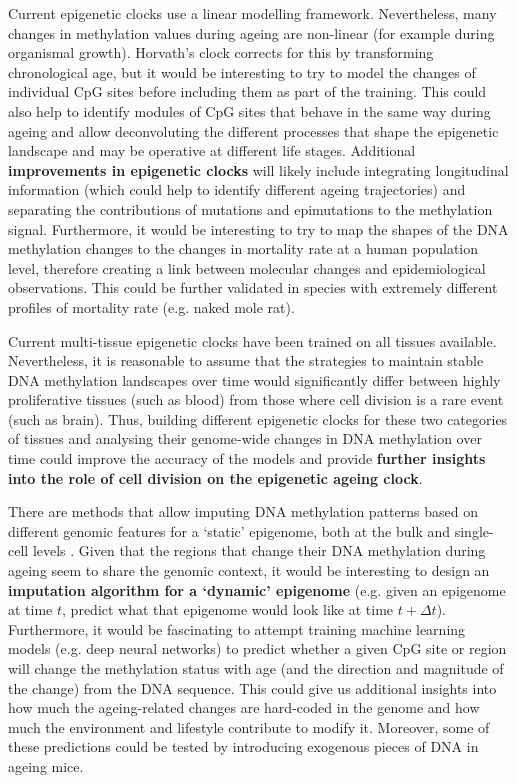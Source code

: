 \bigskip

Current epigenetic clocks use a linear modelling framework. Nevertheless, many changes in methylation values during ageing are non-linear (for example during organismal growth). Horvath's clock corrects for this by transforming chronological age, but it would be interesting to try to model the changes of individual CpG sites before including them as part of the training. This could also help to identify modules of CpG sites that behave in the same way during ageing and allow deconvoluting the different processes that shape the epigenetic landscape and may be operative at different life stages. Additional \textbf{improvements in epigenetic clocks} will likely include integrating longitudinal information (which could help to identify different ageing trajectories) \cite{Jensen2014} and separating the contributions of mutations and epimutations to the methylation signal. Furthermore, it would be interesting to try to map the shapes of the DNA methylation changes to the changes in mortality rate at a human population level, therefore creating a link between molecular changes and epidemiological observations. This could be further validated in species with extremely different profiles of mortality rate (e.g. naked mole rat).

\bigskip

Current multi-tissue epigenetic clocks have been trained on all tissues available. Nevertheless, it is reasonable to assume that the strategies to maintain stable DNA methylation landscapes over time would significantly differ between highly proliferative tissues (such as blood) from those where cell division is a rare event (such as brain). Thus, building different epigenetic clocks for these two categories of tissues and analysing their genome-wide changes in DNA methylation over time could improve the accuracy of the models and provide \textbf{further insights into the role of cell division on the epigenetic ageing clock}.

\bigskip

There are methods that allow imputing DNA methylation patterns based on different genomic features for a `static' epigenome, both at the bulk \cite{Zhang2015} and single-cell levels \cite{Angermueller2017,Kapourani2019}. Given that the regions that change their DNA methylation during ageing seem to share the genomic context, it would be interesting to design an \textbf{imputation algorithm for a `dynamic' epigenome} (e.g. given an epigenome at time $t$, predict what that epigenome would look like at time $t + \Delta t$). Furthermore, it would be fascinating to attempt training machine learning models (e.g. deep neural networks) to predict whether a given CpG site or region will change the methylation status with age (and the direction and magnitude of the change) from the DNA sequence. This could give us additional insights into how much the ageing-related changes are hard-coded in the genome and how much the environment and lifestyle contribute to modify it. Moreover, some of these predictions could be tested by introducing exogenous pieces of DNA in ageing mice.

